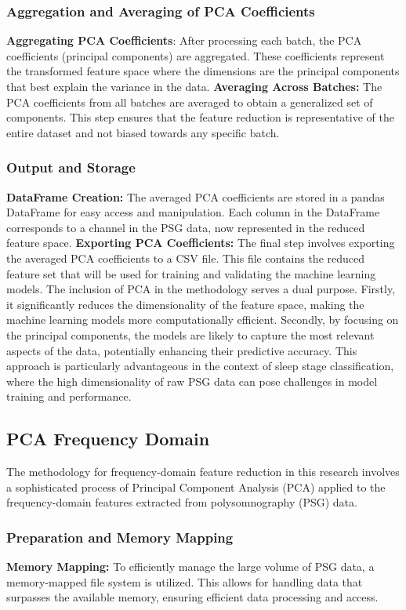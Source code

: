 \documentclass[12pt, a4paper,oneside]{book}
\numberwithin{equation}{section}
\begin{document}
\subsubsection{Aggregation and Averaging of PCA Coefficients}
\textbf{Aggregating PCA Coefficients}: After processing each batch, the PCA coefficients (principal components) are aggregated. These coefficients represent the transformed feature space where the dimensions are the principal components that best explain the variance in the data.
\textbf{Averaging Across Batches:} The PCA coefficients from all batches are averaged to obtain a generalized set of components. This step ensures that the feature reduction is representative of the entire dataset and not biased towards any specific batch.
\subsubsection{Output and Storage}
\textbf{DataFrame Creation:} The averaged PCA coefficients are stored in a pandas DataFrame for easy access and manipulation. Each column in the DataFrame corresponds to a channel in the PSG data, now represented in the reduced feature space.
\textbf{Exporting PCA Coefficients:} The final step involves exporting the averaged PCA coefficients to a CSV file. This file contains the reduced feature set that will be used for training and validating the machine learning models.
\newline \newline
The inclusion of PCA in the methodology serves a dual purpose. Firstly, it significantly reduces the dimensionality of the feature space, making the machine learning models more computationally efficient. Secondly, by focusing on the principal components, the models are likely to capture the most relevant aspects of the data, potentially enhancing their predictive accuracy. This approach is particularly advantageous in the context of sleep stage classification, where the high dimensionality of raw PSG data can pose challenges in model training and performance.
\subsection{PCA Frequency Domain}
The methodology for frequency-domain feature reduction in this research involves a sophisticated process of Principal Component Analysis (PCA) applied to the frequency-domain features extracted from polysomnography (PSG) data.
\subsubsection{Preparation and Memory Mapping}
\textbf{Memory Mapping:} To efficiently manage the large volume of PSG data, a memory-mapped file system is utilized. This allows for handling data that surpasses the available memory, ensuring efficient data processing and access.
\end{document}
